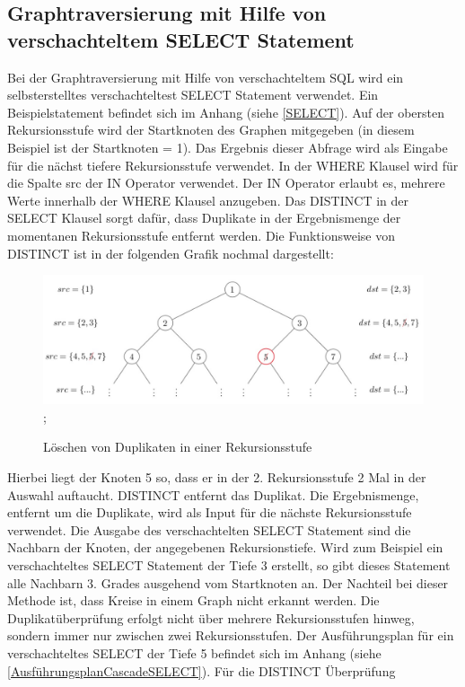 \subsection{Graphtraversierung mit Hilfe von verschachteltem SELECT Statement}
Bei der Graphtraversierung mit Hilfe von verschachteltem \ac{SQL} wird ein selbsterstelltes verschachteltest SELECT Statement verwendet. Ein Beispielstatement
befindet sich im Anhang (siehe \ref{SELECT}). Auf der obersten Rekursionsstufe wird der Startknoten des Graphen mitgegeben (in diesem Beispiel ist der Startknoten = 1).
Das Ergebnis dieser Abfrage wird als Eingabe für die nächst tiefere Rekursionsstufe verwendet. In der WHERE Klausel wird für die Spalte src der IN Operator verwendet.
Der IN Operator erlaubt es, mehrere Werte innerhalb der WHERE Klausel anzugeben. Das DISTINCT in der SELECT Klausel sorgt dafür, dass Duplikate in der Ergebnismenge
der momentanen Rekursionsstufe entfernt werden. Die Funktionsweise von DISTINCT ist in der folgenden
Grafik nochmal dargestellt:
\begin{figure}[H]
    \includegraphics[width = \linewidth]{images/Distinct.jpg};
    \caption{Löschen von Duplikaten in einer Rekursionsstufe}
\end{figure}
Hierbei liegt der Knoten 5 so, dass er in der 2. Rekursionsstufe 2 Mal in der Auswahl auftaucht. DISTINCT entfernt das Duplikat. Die Ergebnismenge, entfernt um die
Duplikate, wird als Input für die nächste Rekursionsstufe verwendet.
Die Ausgabe des verschachtelten SELECT Statement sind die Nachbarn der Knoten, der angegebenen Rekursionstiefe. Wird zum Beispiel ein
verschachteltes SELECT Statement der Tiefe 3 erstellt, so gibt dieses Statement alle Nachbarn 3. Grades ausgehend vom Startknoten an. Der Nachteil bei dieser Methode ist, dass
Kreise in einem Graph nicht erkannt werden. Die Duplikatüberprüfung erfolgt nicht über mehrere Rekursionsstufen hinweg, sondern immer nur zwischen zwei Rekursionsstufen.
Der Ausführungsplan für ein verschachteltes SELECT der Tiefe 5 befindet sich im Anhang (siehe \ref{AusführungsplanCascadeSELECT}). Für die DISTINCT Überprüfung
